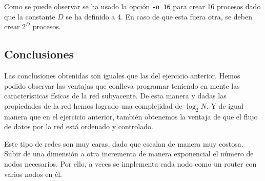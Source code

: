 \documentclass[11pt]{article}
\begin{document}
Como se puede observar se ha usado la opción \texttt{-n 16} para crear 16 procesos dado que la constante $D$ se ha definido a 4. En caso de que esta fuera otra, se deben crear $2^D$ procesos.


\subsection{Conclusiones}
Las conclusiones obtenidas son iguales que las del ejercicio anterior. Hemos podido observar las ventajas que conlleva programar teniendo en mente las características físicas de la red subyacente. De esta manera y dadas las propiedades de la red hemos logrado una complejidad de $\log_2{N}$. Y de igual manera que en el ejercicio anterior, también obtenemos la ventaja de que el flujo de datos por la red está ordenado y controlado.

Este tipo de redes son muy caras, dado que escalan de manera muy costosa. Subir de una dimensión a otra incrementa de manera exponencial el número de nodos necesarios. Por ello, a veces se implementa cada nodo como un router con varios nodos en él.


\newpage
\nocite{*}  %


\end{document}
